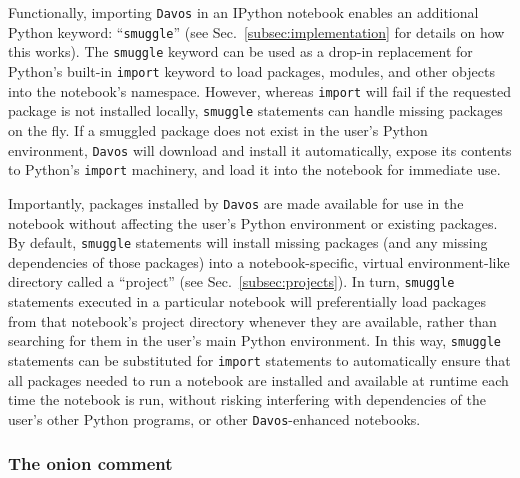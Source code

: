 \documentclass[preprint,12pt,a4paper]{elsarticle}
\begin{document}
Functionally, importing \texttt{Davos} in an IPython notebook enables
an additional Python keyword: ``\texttt{smuggle}'' (see
Sec.~\ref{subsec:implementation} for details on how this works).
The \texttt{smuggle} keyword can be used as a drop-in
replacement for Python's built-in \texttt{import} keyword to load
packages, modules, and other objects into the notebook's namespace.
However, whereas \texttt{import} will fail if the requested package is
not installed locally, \texttt{smuggle} statements can handle missing
packages on the fly. If a smuggled package does not exist in the
user's Python environment, \texttt{Davos} will download and install it automatically,
expose its contents to Python's \texttt{import} machinery, and load it
into the notebook for immediate use.

Importantly, packages installed by \texttt{Davos} are made available for use in the
notebook without affecting the user's Python environment or existing packages.
By default, \texttt{smuggle} statements will install missing packages (and any
missing dependencies of those packages) into a notebook-specific, virtual
environment-like directory called a ``project'' (see
Sec.~\ref{subsec:projects}). In turn, \texttt{smuggle} statements executed in a
particular notebook will preferentially load packages from that notebook's
project directory whenever they are available, rather than searching for them
in the user's main Python environment. In this way, \texttt{smuggle}
statements can be substituted for \texttt{import} statements to automatically
ensure that all packages needed to run a notebook are installed and available
at runtime each time the notebook is run, without risking interfering with
dependencies of the user's other Python programs, or other \texttt{Davos}-enhanced
notebooks.


\subsubsection{The onion comment}\label{subsec:onion}
\end{document}
